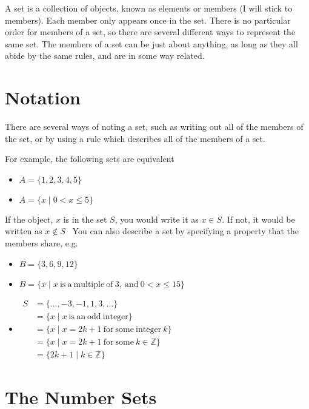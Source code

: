 
A set is a collection of objects, known as elements or members (I will stick to members). Each member only appears once
 in the set. There is no particular order for members of a set, so there are several different ways to represent the
 same set. The members of a set can be just about anything, as long as they all abide by the same rules, and are in
 some way related.

\section*{Notation}

There are several ways of noting a set, such as writing out all of the members of the set, or by using a rule which
 describes all of the members of a set.

For example, the following sets are equivalent
\begin{itemize}
  \item $A = \{1, 2, 3, 4, 5\}$
  \item $A = \{x \mid 0 < x \leq 5\}$
\end{itemize}

If the object, $x$ is in the set $S$, you would write it as $x \in S$. If not, it would be written as $x \notin S$ \
You can also describe a set by specifying a property that the members share, e.g.
\begin{itemize}
  \item $B = \{3, 6, 9, 12\}$
  \item $B = \{x \mid x \mathrm{\ is\ a\ multiple\ of\ } 3 \mathrm{,\ and\ } 0 < x \leq 15\}$
  \item $\begin{aligned}
    S &= \{\dots, -3, -1, 1, 3, \dots\} \\
    & = \{x \mid x \mathrm{\ is\ an\ odd\ integer}\} \\
    & = \{x \mid x = 2k + 1 \mathrm{\ for\ some\ integer\ } k\} \\
    & = \{x \mid x = 2k + 1 \mathrm{\ for\ some\ } k \in \mathbb{Z}\} \\
    & = \{2k + 1 \mid k \in \mathbb{Z}\}
  \end{aligned}$
\end{itemize}

\section*{The Number Sets}

